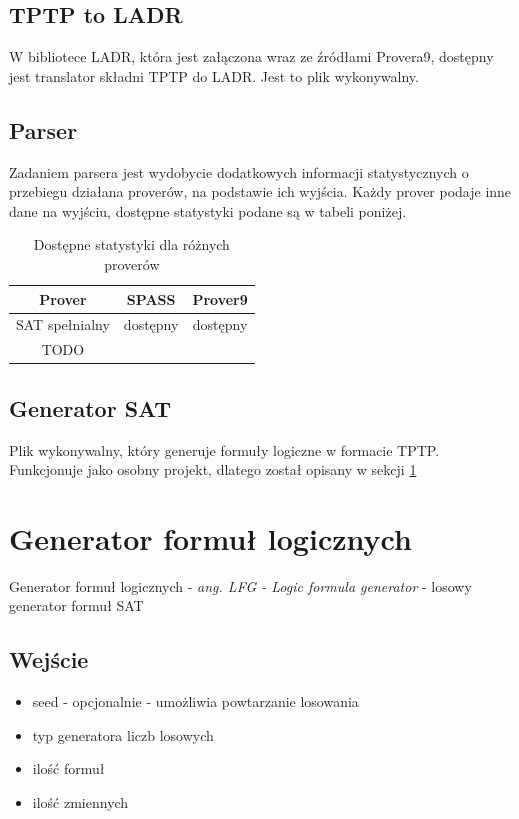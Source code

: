 \documentclass[a4paper,12pt]{article}
\begin{document}
\subsection{TPTP to LADR}

W bibliotece \gls{LADR}, która jest załączona wraz ze źródłami Provera9, dostępny jest translator składni TPTP do LADR. Jest to plik wykonywalny.

\subsection{Parser}

Zadaniem parsera jest wydobycie dodatkowych informacji statystycznych o przebiegu działana proverów, na podstawie ich wyjścia.
\newline
Każdy prover podaje inne dane na wyjściu, dostępne statystyki podane są w tabeli poniżej.

\begin{table}[ht]
  \centering
  \caption{Dostępne statystyki dla różnych proverów}
  \begin{tabular}{ |c|c|c| }
    \hline
    Prover & SPASS & Prover9 \\
    \hline
    SAT spełnialny & dostępny & dostępny \\
    \hline
    TODO & & \\
    \hline
  \end{tabular}
\end{table}


\subsection{Generator SAT}

Plik wykonywalny, który generuje formuły logiczne w formacie TPTP. Funkcjonuje jako osobny projekt, dlatego został opisany w sekcji \ref{LFG}

\section{Generator formuł logicznych}\label{LFG}

Generator formuł logicznych - \textit{ang. LFG - Logic formula generator} - losowy generator formuł SAT

\subsection{Wejście}

\begin{itemize}
  \item seed - opcjonalnie - umożliwia powtarzanie losowania
  \item typ generatora liczb losowych
  \item ilość formuł
  \item ilość zmiennych
\end{itemize}
\end{document}

